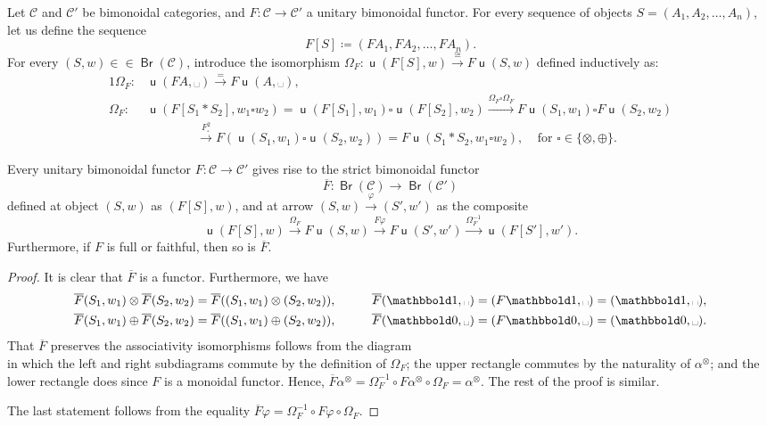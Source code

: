 \documentclass[10pt]{simplearticle}
\newcommand{\tikzinput}[1]{}
\newcommand{\mathsb}[1]{\boldsymbol{\mathsf{#1}}}
\newcommand{\mmph}{\text{{␣}}}
\newcommand{\tensorunit}{\mathbbold1}
\newcommand{\bbzero}{\mathbbold0}
\newcommand{\Br}{\operatorname{\mathsb{Br}}}
\renewcommand{\u}{\operatorname{\mathsb u}}
\begin{document}
Let $\mathcal{C}$ and $\mathcal{C}'$ be bimonoidal categories, and
$F\colon\mathcal{C}\to\mathcal{C}'$ a unitary bimonoidal functor.
For every sequence of objects $S=(A_{1},A_{2},\dots,A_{n})$, let
us define the sequence
\[
F[S]\coloneqq(FA_{1},FA_{2},\dots,FA_{n}).
\]
For every $(S,w)\in\in\Br(\mathcal{C})$, introduce the isomorphism
$\Omega_{F}\colon\u(F[S],w)\xrightarrow{\cong}F\u(S,w)$ defined inductively
as:
\begin{alignat*}{1}
\Omega_{F}\colon & \u(FA,\mmph)\xrightarrow{=}F\u(A,\mmph),\\
\Omega_{F}\colon & \u(F[S_{1}*S_{2}],w_{1}\square w_{2})=\u(F[S_{1}],w_{1})\square\u(F[S_{2}],w_{2})\xrightarrow{\Omega_{F}\square\Omega_{F}}F\u(S_{1},w_{1})\square F\u(S_{2},w_{2})\\
 & \qquad\qquad\xrightarrow{F^{2}_{\square}}F(\u(S_{1},w_{1})\square\u(S_{2},w_{2}))=F\u(S_{1}*S_{2},w_{1}\square w_{2}),~~~~~\textrm{for }\square\in\{\otimes,\oplus\}.
\end{alignat*}

\begin{thm}\label{thm:defFbar}
Every
unitary bimonoidal functor
$F\colon\mathcal{C}\to\mathcal{C}'$ gives rise to the strict bimonoidal
functor
\[
\overline{F}\colon\Br(\mathcal{C})\to\Br(\mathcal{C}')
\]
defined at object $(S,w)$ as $(F[S],w)$, and at arrow $(S,w)\xrightarrow{\varphi}(S',w')$
as the composite
\[
\u(F[S],w)\xrightarrow{\Omega_{F}}F\u(S,w)\xrightarrow{F\varphi}F\u(S',w')\xrightarrow{\Omega^{-1}_{F}}\u(F[S'],w').
\]
Furthermore, if $F$ is full or faithful, then so is $\overline{F}$.
\end{thm}

\begin{proof}
It is clear that $\overline{F}$ is a functor. Furthermore, we have
\begin{alignat*}{2}
\overline{F}(S_{1},w_{1})\otimes\overline{F}(S_{2},w_{2})=\overline{F}((S_{1},w_{1})\otimes(S_{2},w_{2})), & \qquad & \overline{F}(\tensorunit,\mmph)=(F\tensorunit,\mmph)=(\tensorunit,\mmph),\\
\overline{F}(S_{1},w_{1})\oplus\overline{F}(S_{2},w_{2})=\overline{F}((S_{1},w_{1})\oplus(S_{2},w_{2})), &\ 
& \overline{F}(\bbzero,\mmph)=(F\bbzero,\mmph)=(\bbzero,\mmph).
\end{alignat*}
That $\overline{F}$ preserves the associativity isomorphisms follows
from the diagram
\[
\tikzinput{d489}
\]
in which the left and right subdiagrams commute by the definition
of $\Omega_{F}$; the upper rectangle commutes by the naturality of
$\alpha^{\otimes}$; and the lower rectangle does since $F$ is a
monoidal functor. Hence, $\overline{F}\alpha^{\otimes}=\Omega^{-1}_{F}\circ F\alpha^{\otimes}\circ\Omega_{F}=\alpha^{\otimes}$.
The rest of the proof is similar.

The last statement follows from the equality $\overline{F}\varphi=\Omega^{-1}_{F}\circ F\varphi\circ\Omega_{F}$.
\end{proof}
\end{document}
